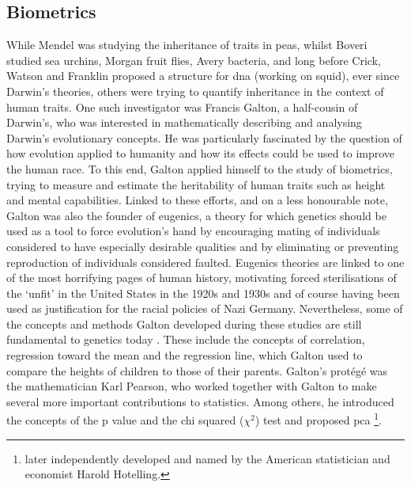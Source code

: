 \subsection{Biometrics} %
\label{sec:biometrics}

While Mendel was studying the inheritance of traits in peas, whilst Boveri studied sea urchins, Morgan fruit flies, Avery bacteria, and long before Crick, Watson and Franklin proposed a structure for \gls{dna} (working on squid), ever since Darwin’s theories, others were trying to quantify inheritance in the context of human traits. 
One such investigator was Francis Galton, a half-cousin of Darwin’s, who was interested in mathematically describing and analysing Darwin’s evolutionary concepts. 
He was particularly fascinated by the question of how evolution applied to humanity and how its effects could be used to improve the human race. 
To this end, Galton applied himself to the study of biometrics, trying to measure and estimate the heritability of human traits such as height and mental capabilities. 
Linked to these efforts, and on a less honourable note, Galton was also the founder of eugenics, a theory for which genetics should be used as a tool to force evolution’s hand by encouraging mating of individuals considered to have especially desirable qualities and by eliminating or preventing reproduction of individuals considered faulted. Eugenics theories are linked to one of the most horrifying pages of human history, motivating forced sterilisations of the `unfit' in the United States in the 1920s and 1930s and of course having been used as justification for the racial policies of Nazi Germany.
Nevertheless, some of the concepts and methods Galton developed during these studies are still fundamental to genetics today \cite{galton1870hereditary}. 
These include the concepts of correlation, regression toward the mean and the regression line, which Galton used to compare the heights of children to those of their parents. 
Galton’s protégé was the mathematician Karl Pearson, who worked together with Galton to make several more important contributions to statistics. 
Among others, he introduced the concepts of the p value and the chi squared ($\chi^2$) test \cite{pearson1900x} and proposed \gls{pca} \cite{pearson1901liii}\footnote{later independently developed and named by the American statistician and economist Harold Hotelling.}.

